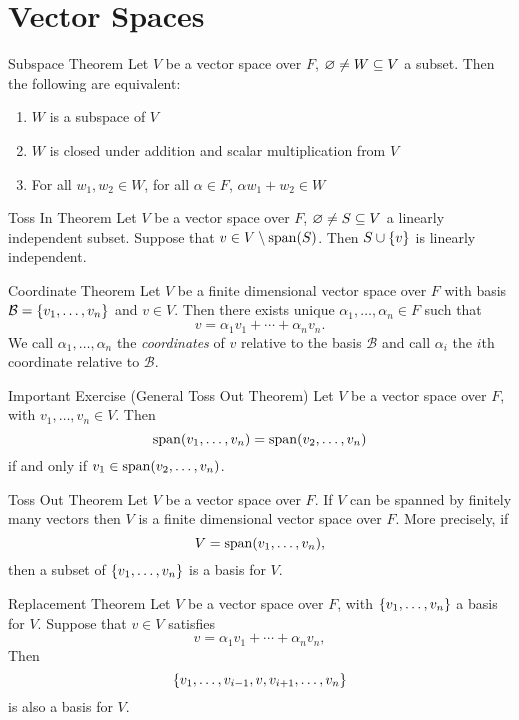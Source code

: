 \documentclass[class=article, crop=false]{standalone}
\begin{document}
  \section{Vector Spaces}
  \begin{theorem}{Subspace Theorem}
    Let $V$ be a vector space over $F$, $\varnothing\neq W\subseteq V$ a subset. Then the following are equivalent:
    \begin{enumerate}[label=(\alph*)]
      \item $W$ is a subspace of $V$
      \item $W$ is closed under addition and scalar multiplication from $V$
      \item For all $w_1,w_2\in W$, for all $\alpha\in F$, $\alpha w_1+w_2\in W$
    \end{enumerate}
  \end{theorem}
  \begin{theorem}{Toss In Theorem}
    Let $V$ be a vector space over $F$, $\varnothing\neq S\subseteq V$ a linearly independent subset. Suppose that $v\in V\setminus \operatorname{span}(S)$. Then $S\cup \left\{v\right\}$ is linearly independent.
  \end{theorem}
  \begin{theorem}{Coordinate Theorem}
    Let $V$ be a finite dimensional vector space over $F$ with basis $\mathcal{B} = \left\{v_1,\dotsc,v_n\right\}$ and $v\in V$. Then there exists unique $\alpha_1,\dotsc,\alpha_n\in F$ such that
    \[
      v = \alpha_1v_1 + \dotsb + \alpha_nv_n.
    \]
    We call $\alpha_1,\dotsc,\alpha_n$ the \emph{coordinates} of $v$ relative to the basis $\mathcal{B}$ and call $\alpha_i$ the $i$th coordinate relative to $\mathcal{B}$.
  \end{theorem}
  \begin{theorem}{Important Exercise (General Toss Out Theorem)}
    Let $V$ be a vector space over $F$, with $v_1,\dotsc,v_n\in V$. Then
    \[
      \operatorname{span}(v_1,\dotsc,v_n) = \operatorname{span}(v_2,\dotsc,v_n)
    \]
    if and only if $v_1\in \operatorname{span}(v_2,\dotsc,v_n)$.
  \end{theorem}
  \begin{theorem}{Toss Out Theorem}
    Let $V$ be a vector space over $F$. If $V$ can be spanned by finitely many vectors then $V$ is a finite dimensional vector space over $F$. More precisely, if 
    \[
      V = \operatorname{span}(v_1,\dotsc,v_n),
    \]
    then a subset of $\left\{v_1,\dotsc,v_n\right\}$ is a basis for $V$.
  \end{theorem}
  \begin{theorem}{Replacement Theorem}
    Let $V$ be a vector space over $F$, with $\left\{v_1,\dotsc,v_n\right\}$ a basis for $V$. Suppose that $v\in V$ satisfies
    \[
      v = \alpha_1v_1 + \dotsb + \alpha_nv_n, \tag*{$\alpha_1,\dotsc,\alpha_n\in F, \alpha_i\neq 0$}
    \]
    Then
    \[
      \left\{v_1,\dotsc,v_{i-1},v,v_{i+1},\dotsc,v_n\right\}
    \]
    is also a basis for $V$.
  \end{theorem}
\end{document}
